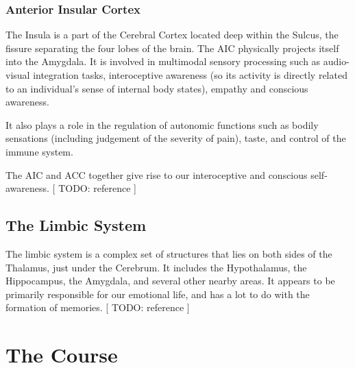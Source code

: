 \documentclass[twocolumn]{article}
\begin{document}
\subsubsection{Anterior Insular Cortex}

The Insula is a part of the Cerebral Cortex located deep within the Sulcus, the
fissure separating the four lobes of the brain. The AIC physically projects itself
into the Amygdala. It is involved in multimodal sensory processing such as
audio-visual integration tasks, interoceptive awareness (so its activity is directly
related to an individual's sense of internal body states), empathy and conscious
awareness. \cite{aicemotion}

It also plays a role in the regulation of autonomic functions such as bodily
sensations (including judgement of the severity of pain), taste, and control of the
immune system. \cite{aicautonomic}

The AIC and ACC together give rise to our interoceptive and conscious
self-awareness. [ TODO: reference ]

\subsection{The Limbic System}

The limbic system is a complex set of structures that lies on both sides of the
Thalamus, just under the Cerebrum. It includes the Hypothalamus, the Hippocampus, the
Amygdala, and several other nearby areas. It appears to be primarily responsible for
our emotional life, and has a lot to do with the formation of memories. [ TODO:
  reference ]

\section{The Course}
\end{document}
